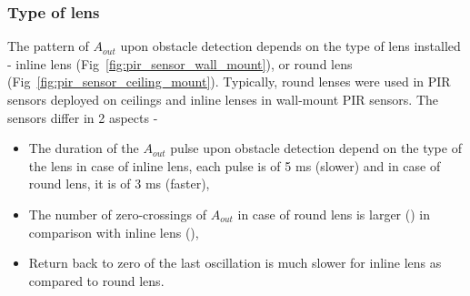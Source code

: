 

\subsubsection{Type of lens} The pattern of $A_{out}$ upon obstacle detection depends on the type of lens installed - \ca inline lens (Fig~\ref{fig:pir_sensor_wall_mount}), or \cb round lens (Fig~\ref{fig:pir_sensor_ceiling_mount}). Typically, round lenses were used in PIR sensors deployed on ceilings and inline lenses in wall-mount PIR sensors. The sensors differ in 2 aspects - \begin{itemize} \item The duration of the $A_{out}$ pulse upon obstacle detection depend on the type of the lens \viz in case of inline lens, each pulse is of 5 ms (\ie slower) and in case of round lens, it is of 3 ms (\ie faster), \item The number of zero-crossings of $A_{out}$ in case of round lens is larger () in comparison with inline lens (),
\item Return back to zero of the last oscillation is much slower for inline lens as compared to round lens.
\end{itemize}

